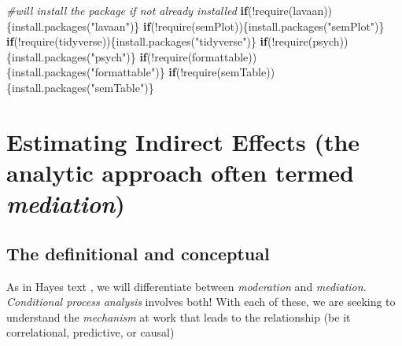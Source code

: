 \documentclass[
  english,
]{book}
\newenvironment{Shaded}{\begin{snugshade}}{\end{snugshade}}
\newcommand{\CommentTok}[1]{\textcolor[rgb]{0.56,0.35,0.01}{\textit{#1}}}
\newcommand{\ControlFlowTok}[1]{\textcolor[rgb]{0.13,0.29,0.53}{\textbf{#1}}}
\newcommand{\FunctionTok}[1]{\textcolor[rgb]{0.00,0.00,0.00}{#1}}
\newcommand{\NormalTok}[1]{#1}
\newcommand{\SpecialCharTok}[1]{\textcolor[rgb]{0.00,0.00,0.00}{#1}}
\newcommand{\StringTok}[1]{\textcolor[rgb]{0.31,0.60,0.02}{#1}}
\begin{document}
\begin{Shaded}
\begin{Highlighting}[]
\CommentTok{\#will install the package if not already installed}
\ControlFlowTok{if}\NormalTok{(}\SpecialCharTok{!}\FunctionTok{require}\NormalTok{(lavaan))\{}\FunctionTok{install.packages}\NormalTok{(}\StringTok{"lavaan"}\NormalTok{)\}}
\ControlFlowTok{if}\NormalTok{(}\SpecialCharTok{!}\FunctionTok{require}\NormalTok{(semPlot))\{}\FunctionTok{install.packages}\NormalTok{(}\StringTok{"semPlot"}\NormalTok{)\}}
\ControlFlowTok{if}\NormalTok{(}\SpecialCharTok{!}\FunctionTok{require}\NormalTok{(tidyverse))\{}\FunctionTok{install.packages}\NormalTok{(}\StringTok{"tidyverse"}\NormalTok{)\}}
\ControlFlowTok{if}\NormalTok{(}\SpecialCharTok{!}\FunctionTok{require}\NormalTok{(psych))\{}\FunctionTok{install.packages}\NormalTok{(}\StringTok{"psych"}\NormalTok{)\}}
\ControlFlowTok{if}\NormalTok{(}\SpecialCharTok{!}\FunctionTok{require}\NormalTok{(formattable))\{}\FunctionTok{install.packages}\NormalTok{(}\StringTok{"formattable"}\NormalTok{)\}}
\ControlFlowTok{if}\NormalTok{(}\SpecialCharTok{!}\FunctionTok{require}\NormalTok{(semTable))\{}\FunctionTok{install.packages}\NormalTok{(}\StringTok{"semTable"}\NormalTok{)\}}
\end{Highlighting}
\end{Shaded}

\hypertarget{estimating-indirect-effects-the-analytic-approach-often-termed-mediation}{%
\section{\texorpdfstring{Estimating Indirect Effects (the analytic approach often termed \emph{mediation})}{Estimating Indirect Effects (the analytic approach often termed mediation)}}\label{estimating-indirect-effects-the-analytic-approach-often-termed-mediation}}

\hypertarget{the-definitional-and-conceptual}{%
\subsection{The definitional and conceptual}\label{the-definitional-and-conceptual}}

As in Hayes text \citeyearpar{hayes_introduction_2018}, we will differentiate between \emph{moderation} and \emph{mediation}. \emph{Conditional process analysis} involves both! With each of these, we are seeking to understand the \emph{mechanism} at work that leads to the relationship (be it correlational, predictive, or causal)
\end{document}
